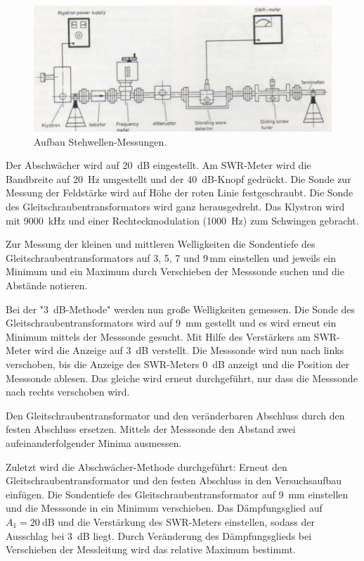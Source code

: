 \FloatBarrier
\begin{figure}
  \centering
  \includegraphics[scale=0.3]{Versuch3.Aufbau.png}
  \caption{Aufbau Stehwellen-Messungen. \cite{Q1}}
  \label{abb:Versuch3.Aufbau}
\end{figure}
\FloatBarrier

Der Abschwächer wird auf \SI{20}{\dB} eingestellt. Am SWR-Meter wird die
Bandbreite auf \SI{20}{\hertz} umgestellt und der \SI{40}{\dB}-Knopf gedrückt.
Die Sonde zur Messung der Feldstärke wird auf Höhe der roten Linie festgeschraubt.
Die Sonde des Gleitschraubentransformators wird ganz herausgedreht.
Das Klystron wird mit \SI{9000}{\kilo\hertz} und einer Rechteckmodulation
(\SI{1000}{\hertz}) zum Schwingen gebracht.

Zur Messung der kleinen und mittleren Welligkeiten die Sondentiefe des
Gleitschraubentransformators auf 3, 5, 7 und 9\,mm einstellen und jeweils ein
Minimum und ein Maximum  durch Verschieben der Messsonde suchen und die Abstände
notieren.

Bei der "\SI{3}{\dB}-Methode" werden nun große Welligkeiten gemessen. Die Sonde
des Gleitschraubentransformators wird auf \SI{9}{\milli\meter} gestellt und es
wird erneut ein Minimum mittels der Messsonde gesucht. Mit Hilfe des Verstärkers
am SWR-Meter wird die Anzeige auf \SI{3}{\dB} verstellt. Die Messsonde wird nun
nach links verschoben, bis die Anzeige des SWR-Meters \SI{0}{\dB} anzeigt und
die Position der Messsonde ablesen. Das gleiche wird erneut durchgeführt, nur dass
die Messsonde nach rechts verschoben wird.

Den Gleitschraubentransformator und den veränderbaren Abschluss durch den
festen Abschluss ersetzen. Mittels der Messsonde den Abstand zwei
aufeinanderfolgender Minima ausmessen.

Zuletzt wird die Abschwächer-Methode durchgeführt:
Erneut den Gleitschraubentransformator und den festen Abschluss in den
Versuchsaufbau einfügen. Die Sondentiefe des Gleitschraubentransformator auf
\SI{9}{\milli\meter} einstellen und die Messsonde in ein Minimum verschieben.
Das Dämpfungsglied auf $A_1=\SI{20}{\dB}$ und die Verstärkung des SWR-Meters
einstellen, sodass der Ausschlag bei \SI{3}{\dB} liegt. Durch Veränderung des
Dämpfungsglieds bei Verschieben der Messleitung wird das relative Maximum
bestimmt.
